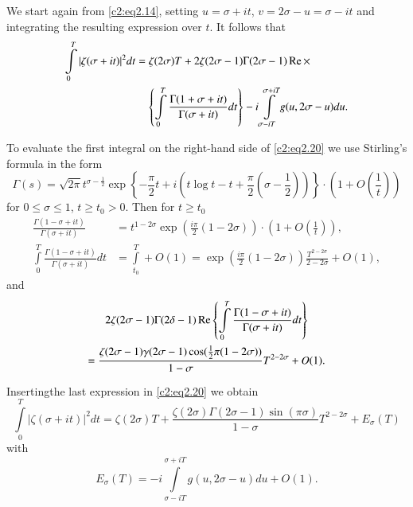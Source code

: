 \medskip
{}

We start again from \eqref{c2:eq2.14}, setting $u= \sigma + it$, $v= 2
\sigma - u = \sigma- it$ and integrating the resulting expression over
$t$. It follows that
\begin{align}
  \int\limits^T_0 |\zeta (\sigma + it)|^2 dt& 
  = \zeta (2 \sigma) T + 2 \zeta (2 \sigma -1) \Gamma (2 \sigma -1)
  \operatorname{Re}\times\notag\\ 
   &\quad\left\{ \int\limits^T_0 \frac{\Gamma (1+ \sigma + it)}{\Gamma
    (\sigma + it)} dt \right\}  - i \int\limits_{\sigma - iT}^{\sigma +
  iT} g(u, 2 \sigma -u)du.\label{c2:eq2.20}
\end{align}

To evaluate the first integral on the right-hand side of
\eqref{c2:eq2.20} we use Stirling's formula in the form
\begin{equation}
  \Gamma (s) = \sqrt{2 \pi} t^{\sigma - \frac{1}{2}} \exp \left\{-
  \frac{\pi}{2} t + i \left(t \log t - t + \frac{\pi}{2} \left(\sigma -
  \frac{1}{2}  \right)\right) \right\} \cdot \left(1+ O \left(
  \frac{1}{t}\right) \right) \label{c2:eq2.21}
\end{equation}
for $0 \leq \sigma \leq 1$, $t \geq t_0 > 0$. Then for $t \geq t_0$
\begin{align*}
  \frac{\Gamma (1- \sigma + it)}{\Gamma (\sigma + it)} & = t^{1- 2
    \sigma} \exp \left(\frac{i \pi}{2} (1- 2 \sigma) \right)\cdot
  \left(1+ O \left(\frac{1}{t} \right) \right),\\
  \int\limits_0^T \frac{\Gamma (1- \sigma + it)}{\Gamma (\sigma + it)}
  dt & = \int\limits_{t_0}^T + O (1) = \exp \left(\frac{i \pi}{2}
  \left(1- 2 \sigma \right) \right) \frac{T^{2- 2\sigma}}{2- 2 \sigma}
  + O (1),
\end{align*}
and 
\begin{multline*}
  2 \zeta (2 \sigma -1) \Gamma (2 \delta -1) \operatorname{Re}
  \left\{\int\limits^T_0 \frac{\Gamma (1- \sigma + it)}{\Gamma (\sigma
    + it)} dt  \right\}\\
  = \frac{\zeta (2 \sigma -1) \gamma (2 \sigma -1)\cos (\frac{1}{2}
    \pi (1- 2 \sigma))}{1- \sigma} T^{2- 2\sigma}+ O (1).
\end{multline*}

Inserting\pageoriginale the last expression in \eqref{c2:eq2.20} we obtain 
$$
\int\limits_0^T |\zeta (\sigma + it)|^2 dt = \zeta (2\sigma) T +
\frac{\zeta (2 \sigma) \Gamma (2 \sigma-1)\sin (\pi \sigma)}{1-
  \sigma} T^{2- 2 \sigma}+ E_\sigma (T)
$$
with
\begin{equation}
  E_\sigma (T) = -i \int\limits_{\sigma - iT}^{\sigma + iT} g(u, 2
  \sigma -u) du + O(1).\label{c2:eq2.22}
\end{equation}

